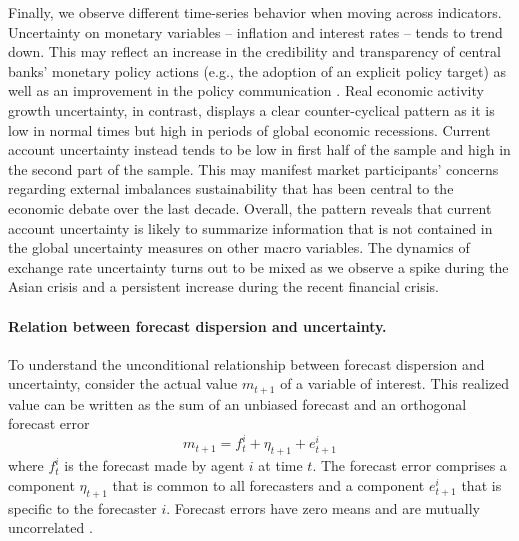 Finally, we observe different time-series behavior when moving across indicators. Uncertainty on monetary variables -- inflation and interest rates -- tends to trend down. This may reflect an increase in the credibility and transparency of central banks' monetary policy actions (e.g., the adoption of an explicit policy target) as well as an improvement in the policy communication \citep[e.g.,][]{bernanke_mishkin1997}. %
Real economic activity growth uncertainty, in contrast, displays a clear counter-cyclical pattern as it is low in normal times but high in periods of global economic recessions. Current account uncertainty instead tends to be low in first half of the sample and high in the second part of the sample. %
This may manifest market participants' concerns regarding external imbalances sustainability that has been central to the economic debate over the last decade. Overall, the pattern reveals that current account uncertainty is likely to summarize information that is not contained in the global uncertainty measures on other macro variables. The dynamics of exchange rate uncertainty turns out to be mixed as we observe a spike during the Asian crisis and a persistent increase during the recent financial crisis.

\paragraph{Relation between forecast dispersion and uncertainty.}
To understand the unconditional relationship between forecast dispersion and uncertainty, consider the actual value $m_{t+1}$ of a variable of interest. This realized value can be written as the sum of an unbiased forecast and an orthogonal forecast error
\begin{equation*}
m_{t+1} = f^i_t + \eta_{t+1} + e^i_{t+1}
\end{equation*}
where $f^i_t$ is the forecast made by agent $i$ at time $t$. The forecast error comprises a component $\eta_{t+1}$ that is common to all forecasters and a component $e^i_{t+1}$ that is specific to the forecaster $i$. Forecast errors have zero means and are mutually uncorrelated \citep[e.g.,][]{lahiri_sheng2010,jurado_etal2015}.

